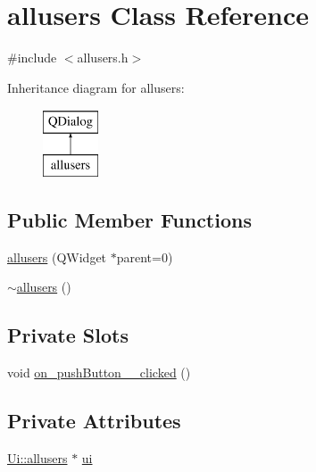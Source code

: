 \hypertarget{classallusers}{\section{allusers Class Reference}
\label{classallusers}
}


{\ttfamily \#include $<$allusers.\-h$>$}

Inheritance diagram for allusers\-:\begin{figure}[H]
\begin{center}
\leavevmode
\includegraphics[height=2.000000cm]{classallusers}
\end{center}
\end{figure}
\subsection*{Public Member Functions}
\begin{DoxyCompactItemize}
\item 
\hyperlink{classallusers_ac0f3d7bc4255531242d196f2793f6582}{allusers} (Q\-Widget $\ast$parent=0)
\item 
\hyperlink{classallusers_a80c2b459737105578d841f20b29c8ace}{$\sim$allusers} ()
\end{DoxyCompactItemize}
\subsection*{Private Slots}
\begin{DoxyCompactItemize}
\item 
void \hyperlink{classallusers_ae4418ba485da07d651241cbecbd0414a}{on\-\_\-push\-Button\-\_\-\_\-clicked} ()
\end{DoxyCompactItemize}
\subsection*{Private Attributes}
\begin{DoxyCompactItemize}
\item 
\hyperlink{classUi_1_1allusers}{Ui\-::allusers} $\ast$ \hyperlink{classallusers_a3a8127e4f183a49f532a696a341efdbf}{ui}
\end{DoxyCompactItemize}


